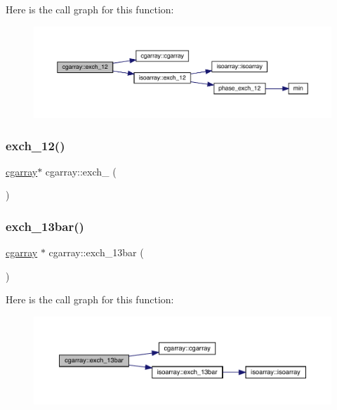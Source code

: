 Here is the call graph for this function\+:\nopagebreak
\begin{figure}[H]
\begin{center}
\leavevmode
\includegraphics[width=350pt]{d7/d55/classcgarray_a59212ed070a6ebdc199063d7c7eaee50_cgraph}
\end{center}
\end{figure}
\mbox{\label{classcgarray_a86ce4d7c72cddf62047e018d1199df8c}} 
\subsubsection{\texorpdfstring{exch\_12()}{exch\_12()}\hspace{0.1cm}{\footnotesize\ttfamily [2/2]}}
{\footnotesize\ttfamily \mbox{\hyperlink{classcgarray}{cgarray}}$\ast$ cgarray\+::exch\+\_ (\begin{DoxyParamCaption}{ }\end{DoxyParamCaption})}

\mbox{\label{classcgarray_a961a09e4792a1e3b9b9c7ac10f02bc1b}} 
\subsubsection{\texorpdfstring{exch\_13bar()}{exch\_13bar()}\hspace{0.1cm}{\footnotesize\ttfamily [1/2]}}
{\footnotesize\ttfamily \mbox{\hyperlink{classcgarray}{cgarray}} $\ast$ cgarray\+::exch\+\_\+13bar (\begin{DoxyParamCaption}{ }\end{DoxyParamCaption})}

Here is the call graph for this function\+:\nopagebreak
\begin{figure}[H]
\begin{center}
\leavevmode
\includegraphics[width=350pt]{d7/d55/classcgarray_a961a09e4792a1e3b9b9c7ac10f02bc1b_cgraph}
\end{center}
\end{figure}
\mbox{\label{classcgarray_af08670dc7c69194e4f7ace902daac0bf}} 
